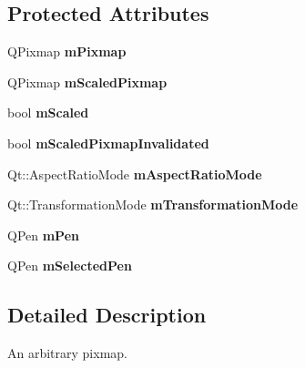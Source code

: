 \subsection*{\-Protected \-Attributes}
\begin{DoxyCompactItemize}
\item 
\hypertarget{classQCPItemPixmap_a1396cce7f26c7b8e9512906284380c4d}{\-Q\-Pixmap {\bfseries m\-Pixmap}}\label{classQCPItemPixmap_a1396cce7f26c7b8e9512906284380c4d}

\item 
\hypertarget{classQCPItemPixmap_a2ebc66e15b9f1264563d58f29ba1bc00}{\-Q\-Pixmap {\bfseries m\-Scaled\-Pixmap}}\label{classQCPItemPixmap_a2ebc66e15b9f1264563d58f29ba1bc00}

\item 
\hypertarget{classQCPItemPixmap_a8fe670a529cd46a9b8afd9fc1203bc3f}{bool {\bfseries m\-Scaled}}\label{classQCPItemPixmap_a8fe670a529cd46a9b8afd9fc1203bc3f}

\item 
\hypertarget{classQCPItemPixmap_a223134abd4cf3d6c368573c622bd2e1c}{bool {\bfseries m\-Scaled\-Pixmap\-Invalidated}}\label{classQCPItemPixmap_a223134abd4cf3d6c368573c622bd2e1c}

\item 
\hypertarget{classQCPItemPixmap_a8dc6b6c1e106ac523efae22d5fe55bab}{\-Qt\-::\-Aspect\-Ratio\-Mode {\bfseries m\-Aspect\-Ratio\-Mode}}\label{classQCPItemPixmap_a8dc6b6c1e106ac523efae22d5fe55bab}

\item 
\hypertarget{classQCPItemPixmap_ac9ecad3b9842363754e32eda2cf821bd}{\-Qt\-::\-Transformation\-Mode {\bfseries m\-Transformation\-Mode}}\label{classQCPItemPixmap_ac9ecad3b9842363754e32eda2cf821bd}

\item 
\hypertarget{classQCPItemPixmap_acfee1124eb51a1887aaf8de10777c7a1}{\-Q\-Pen {\bfseries m\-Pen}}\label{classQCPItemPixmap_acfee1124eb51a1887aaf8de10777c7a1}

\item 
\hypertarget{classQCPItemPixmap_a0949e5bb6a261fc4e9668e28e2effcfa}{\-Q\-Pen {\bfseries m\-Selected\-Pen}}\label{classQCPItemPixmap_a0949e5bb6a261fc4e9668e28e2effcfa}

\end{DoxyCompactItemize}


\subsection{\-Detailed \-Description}
\-An arbitrary pixmap. 

